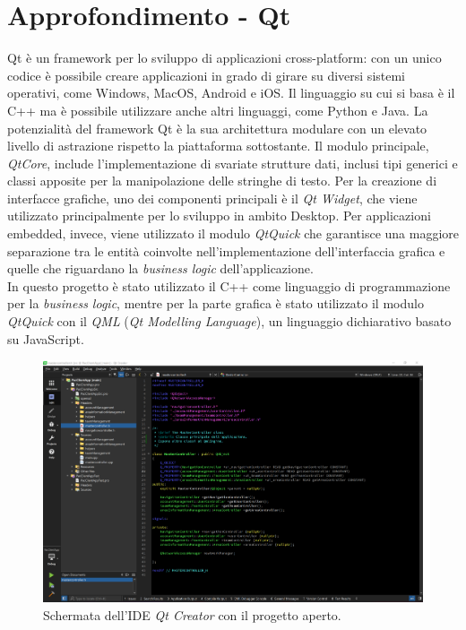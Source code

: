 \section{Approfondimento - Qt}
Qt è un framework per lo sviluppo di applicazioni cross-platform: con un unico codice è possibile creare applicazioni in grado di girare su diversi sistemi operativi, come Windows, MacOS, Android e iOS. Il linguaggio su cui si basa è il C++ ma è possibile utilizzare anche altri linguaggi, come Python e Java. La potenzialità del framework Qt è la sua architettura modulare con un elevato livello di astrazione rispetto la piattaforma sottostante. Il modulo principale, \textit{QtCore}, include l'implementazione di svariate strutture dati, inclusi tipi generici e classi apposite per la manipolazione delle stringhe di testo. Per la creazione di interfacce grafiche, uno dei componenti principali è il \textit{Qt Widget}, che viene utilizzato principalmente per lo sviluppo in ambito Desktop. Per applicazioni embedded, invece, viene utilizzato il modulo \textit{QtQuick} che garantisce una maggiore separazione tra le entità coinvolte nell'implementazione dell'interfaccia grafica e quelle che riguardano la \textit{business logic} dell'applicazione. 
\\
In questo progetto è stato utilizzato il C++ come linguaggio di programmazione per la \textit{business logic}, mentre per la parte grafica è stato utilizzato il modulo \textit{QtQuick} con il \textit{QML} (\textit{Qt Modelling Language}), un linguaggio dichiarativo basato su JavaScript. 

\begin{figure}[h!]
	\centering
	\includegraphics[width=0.8\linewidth]{./Conclusione/ImageFiles/Qt Framework}
	\caption{Schermata dell'IDE \textit{Qt Creator} con il progetto aperto.}
	\label{fig:qtFramework}
\end{figure}


